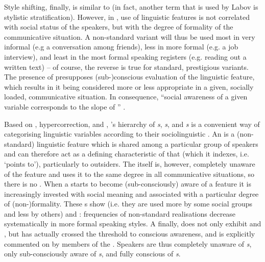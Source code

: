 Style shifting, finally, is similar to  (in fact, another term that is used by Labov is stylistic stratification).
However, in , use of linguistic features is not correlated with social status of the speakers, but with the degree of formality of the communicative situation.
A non-standard variant will thus be used most in very informal (e.g a conversation among friends), less in more formal (e.g. a job interview), and least in the most formal speaking registers (e.g. reading out a written text) -- of course, the reverse is true for standard, prestigious variants.
The presence of  presupposes (sub-)conscious evaluation of the linguistic feature, which results in it being considered more or less appropriate in a given, socially loaded, communicative situation.
In consequence, ``social awareness of a given variable corresponds to the slope of '' \parencite[196]{labov2001a}.

Based on , hypercorrection, and , \citeauthor{labov1972}'s \citeyear{labov1972} hierarchy of \emph{s}, \emph{s}, and \emph{s} is a convenient way of categorising linguistic variables according to their sociolinguistic .
An  is a (non-standard) linguistic feature which is shared among a particular group of speakers and can therefore act as a defining characteristic of that  (which it indexes, i.e. `points to'), particularly to outsiders.
The  itself is, however, completely unaware of the feature and uses it to the same degree in all communicative situations, so there is no .
When a  starts to become (sub-consciously) aware of a feature it is increasingly invested with social meaning and associated with a particular degree of (non-)formality.
These s show  (i.e. they are used more by some social groups and less by others) and : frequencies of non-standard realisations decrease systematically in more formal speaking styles.
A \emph{} finally, does not only exhibit  and , but has actually crossed the threshold to conscious awareness, and is explicitly commented on by members of the  \parencite[cf.][178--180]{labov1972}.
Speakers are thus completely unaware of \emph{s}, only sub-consciously aware of \emph{s}, and fully conscious of \emph{s}.

